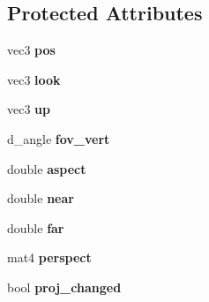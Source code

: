 \subsection*{Protected Attributes}
\begin{DoxyCompactItemize}
\item 
\hypertarget{classgfx_1_1proj__cam_ac1ab5332debb501a37b5de30617880d2}{vec3 {\bfseries pos}}\label{classgfx_1_1proj__cam_ac1ab5332debb501a37b5de30617880d2}

\item 
\hypertarget{classgfx_1_1proj__cam_a27784dac2322e2f20e633a45a42411ab}{vec3 {\bfseries look}}\label{classgfx_1_1proj__cam_a27784dac2322e2f20e633a45a42411ab}

\item 
\hypertarget{classgfx_1_1proj__cam_a877c175c8b29f85ab3a4ea92f3e5d977}{vec3 {\bfseries up}}\label{classgfx_1_1proj__cam_a877c175c8b29f85ab3a4ea92f3e5d977}

\item 
\hypertarget{classgfx_1_1proj__cam_ac049cd3c7dbcf9cbf5b88613bed7d244}{d\-\_\-angle {\bfseries fov\-\_\-vert}}\label{classgfx_1_1proj__cam_ac049cd3c7dbcf9cbf5b88613bed7d244}

\item 
\hypertarget{classgfx_1_1proj__cam_a73fe11c5cdfe4947160bd3e7ab6b6732}{double {\bfseries aspect}}\label{classgfx_1_1proj__cam_a73fe11c5cdfe4947160bd3e7ab6b6732}

\item 
\hypertarget{classgfx_1_1proj__cam_afdbbd67b960c2ab5b9b0956cbe9030df}{double {\bfseries near}}\label{classgfx_1_1proj__cam_afdbbd67b960c2ab5b9b0956cbe9030df}

\item 
\hypertarget{classgfx_1_1proj__cam_a93986237b2dd89bf2bb47c9e676ba975}{double {\bfseries far}}\label{classgfx_1_1proj__cam_a93986237b2dd89bf2bb47c9e676ba975}

\item 
\hypertarget{classgfx_1_1proj__cam_a2f2d2e68eee3d2975056e874b05634ae}{mat4 {\bfseries perspect}}\label{classgfx_1_1proj__cam_a2f2d2e68eee3d2975056e874b05634ae}

\item 
\hypertarget{classgfx_1_1proj__cam_af3c86c7a6882a0a1b8f3820e401696f9}{bool {\bfseries proj\-\_\-changed}}\label{classgfx_1_1proj__cam_af3c86c7a6882a0a1b8f3820e401696f9}

\end{DoxyCompactItemize}



